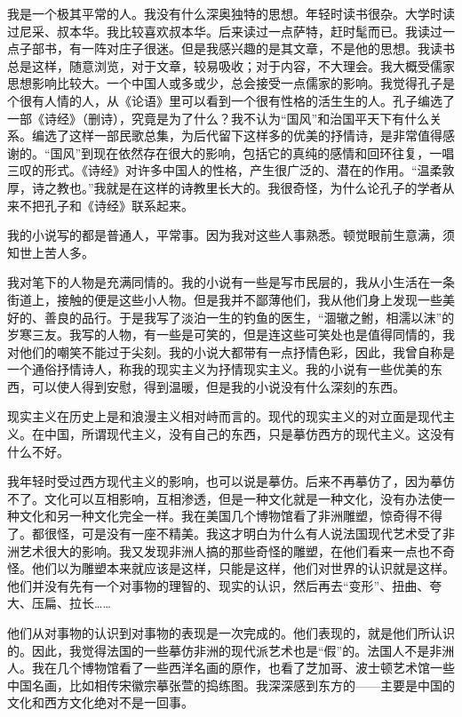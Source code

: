 \documentclass[fontset=fandol,12pt,a5paper]{ctexbook}
\begin{document}
我是一个极其平常的人。我没有什么深奥独特的思想。年轻时读书很杂。大学时读过尼采、叔本华。我比较喜欢叔本华。后来读过一点萨特，赶时髦而已。我读过一点子部书，有一阵对庄子很迷。但是我感兴趣的是其文章，不是他的思想。我读书总是这样，随意浏览，对于文章，较易吸收；对于内容，不大理会。我大概受儒家思想影响比较大。一个中国人或多或少，总会接受一点儒家的影响。我觉得孔子是个很有人情的人，从《论语》里可以看到一个很有性格的活生生的人。孔子编选了一部《诗经》（删诗），究竟是为了什么？我不认为“国风”和治国平天下有什么关系。编选了这样一部民歌总集，为后代留下这样多的优美的抒情诗，是非常值得感谢的。“国风”到现在依然存在很大的影响，包括它的真纯的感情和回环往复，一唱三叹的形式。《诗经》对许多中国人的性格，产生很广泛的、潜在的作用。“温柔敦厚，诗之教也。”我就是在这样的诗教里长大的。我很奇怪，为什么论孔子的学者从来不把孔子和《诗经》联系起来。

我的小说写的都是普通人，平常事。因为我对这些人事熟悉。顿觉眼前生意满，须知世上苦人多。

我对笔下的人物是充满同情的。我的小说有一些是写市民层的，我从小生活在一条街道上，接触的便是这些小人物。但是我并不鄙薄他们，我从他们身上发现一些美好的、善良的品行。于是我写了淡泊一生的钓鱼的医生，“涸辙之鲋，相濡以沫”的岁寒三友。我写的人物，有一些是可笑的，但是连这些可笑处也是值得同情的，我对他们的嘲笑不能过于尖刻。我的小说大都带有一点抒情色彩，因此，我曾自称是一个通俗抒情诗人，称我的现实主义为抒情现实主义。我的小说有一些优美的东西，可以使人得到安慰，得到温暖，但是我的小说没有什么深刻的东西。

现实主义在历史上是和浪漫主义相对峙而言的。现代的现实主义的对立面是现代主义。在中国，所谓现代主义，没有自己的东西，只是摹仿西方的现代主义。这没有什么不好。

我年轻时受过西方现代主义的影响，也可以说是摹仿。后来不再摹仿了，因为摹仿不了。文化可以互相影响，互相渗透，但是一种文化就是一种文化，没有办法使一种文化和另一种文化完全一样。我在美国几个博物馆看了非洲雕塑，惊奇得不得了。都很怪，可是没有一座不精美。我这才明白为什么有人说法国现代艺术受了非洲艺术很大的影响。我又发现非洲人搞的那些奇怪的雕塑，在他们看来一点也不奇怪。他们以为雕塑本来就应该是这样，只能是这样，他们对世界的认识就是这样。他们并没有先有一个对事物的理智的、现实的认识，然后再去“变形”、扭曲、夸大、压扁、拉长……

他们从对事物的认识到对事物的表现是一次完成的。他们表现的，就是他们所认识的。因此，我觉得法国的一些摹仿非洲的现代派艺术也是“假”的。法国人不是非洲人。我在几个博物馆看了一些西洋名画的原作，也看了芝加哥、波士顿艺术馆一些中国名画，比如相传宋徽宗摹张萱的捣练图。我深深感到东方的——主要是中国的文化和西方文化绝对不是一回事。
\end{document}
